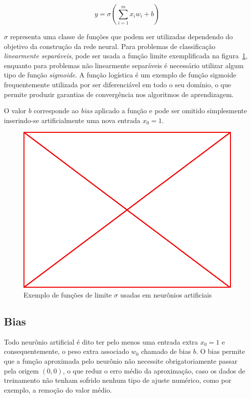 $$y=\sigma(\sum_{i=1}^{m}x_i w_i + b)$$

$\sigma$ representa uma classe de funções que podem ser utilizadas dependendo
do objetivo da construção da rede neural. Para problemas de classificação
\emph{linearmente separáveis}, pode ser usada a função limite exemplificada na
figura~\ref{fig:lim-fun}, enquanto para problemas não linearmente separáveis é
necessário utilizar algum tipo de função \emph{sigmoide}. A função logística é
um exemplo de função sigmoide frequentemente utilizada por ser diferenciável em
todo o seu domínio, o que permite produzir garantias de convergência nos
algoritmos de aprendizagem.

O valor $b$ corresponde ao \emph{bias} aplicado a função e pode ser omitido
simplesmente inserindo-se artificialmente uma nova entrada $x_0 = 1$.

\begin{figure}\label{fig:lim-fun}
  \caption{Exemplo de funções de limite $\sigma$ usadas em neurônios artificiais}
  \begin{center}
    \includegraphics[scale=0.5]{placeholder}
  \end{center}
\end{figure}

\subsection{Bias}

Todo neurônio artificial é dito ter pelo menos uma entrada extra $x_0 = 1$ e
consequentemente, o peso extra associado $w_0$ chamado de bias $b$. O bias
permite que a função aproximada pelo neurônio não necessite obrigatoriamente
passar pela origem $(0,0)$, o que reduz o erro médio da aproximação, caso os
dados de treinamento não tenham sofrido nenhum tipo de ajuste numérico, como por
exemplo, a remoção do valor médio.


